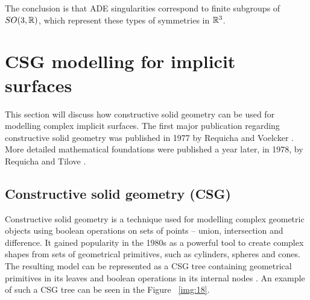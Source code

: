 The conclusion is that ADE singularities correspond to finite subgroups of
$SO(3, \mathbb{R})$, which represent these types of symmetries in $\mathbb{R}^3$.

\section{CSG modelling for implicit surfaces}
\label{sub2.6}
This section will discuss how constructive solid geometry can be used for
modelling complex implicit surfaces. The first major publication regarding constructive
solid geometry was published in 1977 by Requicha and Voelcker \cite{requicha1977constructive}.
More detailed mathematical foundations were published a year later, in 1978, by
Requicha and Tilove \cite{requicha1978mathematical}.
\subsection{Constructive solid geometry (CSG)}
Constructive solid geometry is a technique used for modelling complex geometric
objects using boolean operations on sets of points -- union, intersection and
difference. It gained popularity in the 1980s as a powerful tool to create complex
shapes from sets of geometrical primitives, such as cylinders, spheres and cones.
The resulting model can be represented as a CSG tree containing geometrical
primitives in its leaves and boolean operations in its internal nodes 
\cite{foley1996computer}. An example of such a CSG tree can be seen in the Figure~
\ref{img:18}.

